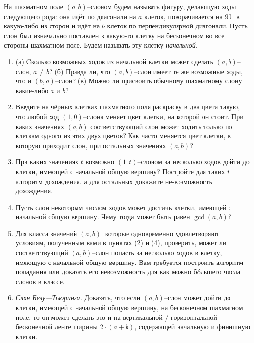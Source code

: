 
\ms На шахматном поле $(a,b)$--слоном будем называть фигуру, делающую ходы следующего рода: она идёт по диагонали на $a$ клеток, поворачивается на $90^{\circ}$ в какую-либо из сторон и идёт на $b$ клеток по перпендикулярной диагонали. Пусть слон был изначально поставлен в какую-то клетку на бесконечном во все стороны шахматном поле. Будем называть эту клетку {\itshape начальной}.

\begin{enumerate}

\item (а) Cколько возможных ходов из начальной клетки может сделать $(a,b)$--слон, $a \ne b$? (б) Правда ли, что $(a,b)$--слон имеет те же возможные ходы, что и $(b,a)$--слон? (в) Можно ли присвоить обычному шахматному слону какие-либо $a$ и $b$?

\item Введите на чёрных клетках шахматного поля раскраску в два цвета такую, что любой ход $(1,0)$--слона меняет цвет клетки, на которой он стоит. При каких значениях $(a,b)$ соответствующий слон может ходить только по клеткам одного из этих двух цветов? Как часто меняется цвет клетки, в которую приходит слон, при остальных значениях $(a,b)$?

\item При каких значениях $t$ возможно $(1,t)$--слоном за несколько ходов дойти до клетки, имеющей с начальной общую вершину? Постройте для таких $t$ алгоритм дохождения, а для остальных докажите не-\linebreak возможность дохождения.

\item Пусть слон некоторым числом ходов может достичь клетки, имеющей с начальной общую вершину. Чему тогда может быть равен $\gcd (a,b)$?

\item Для класса значений $(a,b)$, которые одновременно удовлетворяют условиям, полученным вами в пунктах (2) и (4), проверить, может ли соответствующий $(a,b)$--слон попасть за несколько ходов в клетку, имеющую с начальной общую вершину. Вам требуется построить алгоритм попадания или доказать его невозможность для как можно б\'oльшего числа слонов в классе.

\item {\itshape Слон Безу---Тьюринга.} Доказать, что если $(a,b)$--слон может дойти до клетки, имеющей с начальной общую вершину, на бесконечном шахматном поле, то он может сделать это и на вертикальной / горизонтальной бесконечной ленте ширины $2\cdot(a+b)$, содержащей начальную и финишную клетки.


\end{enumerate}
